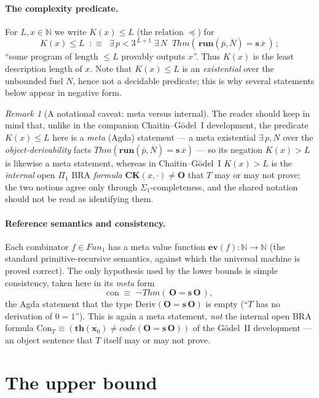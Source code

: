 \documentclass[11pt]{article}
\theoremstyle{plain}
\theoremstyle{definition}
\theoremstyle{remark}
\newtheorem{remark}[theorem]{Remark}
\newcommand{\code}[1]{\mathit{code}(#1)}
\newcommand{\thmT}{\mathbf{th}}
\newcommand{\run}{\mathbf{run}}
\newcommand{\ev}{\mathbf{ev}}
\newcommand{\Fun}{\mathit{Fun}}
\newcommand{\Con}{\mathrm{Con}}
\newcommand{\Thm}[1]{\mathit{Thm}(#1)}
\newcommand{\Kc}{K}
\newcommand{\Kle}{\preccurlyeq}
\begin{document}
\paragraph{The complexity predicate.}
For $L,x\in\mathbb N$ we write $\Kc(x)\le L$ (the relation $\Kle$) for
\[
  \Kc(x)\le L \;\;:\equiv\;\;
  \exists\,p<3^{\,L+1}\;\exists\,N\;\;
  \Thm{\,\run(\overline p,\overline N)=\mathbf{s}\,\overline x\,}\,;
\]
``some program of length $\le L$ provably outputs $x$''. Thus $\Kc(x)$ is
the least description length of $x$. Note that $\Kc(x)\le L$ is an
\emph{existential} over the unbounded fuel $N$, hence not a decidable
predicate; this is why several statements below appear in negative form.

\begin{remark}[A notational caveat: meta versus internal]
The reader should keep in mind that, unlike in the companion
Chaitin--G\"odel~I development, the predicate $\Kc(x)\le L$ here is a
\emph{meta} (Agda) statement --- a meta existential $\exists\,p,N$ over the
\emph{object-derivability} facts $\Thm{\run(\overline p,\overline
N)=\mathbf{s}\,\overline x}$ --- so its negation $\Kc(x)>L$ is likewise a
meta statement, whereas in Chaitin--G\"odel~I $\Kc(x)>L$ is the
\emph{internal} open $\Pi_1$ BRA \emph{formula} $\mathbf{CK}(x,\cdot)\neq
\mathbf{O}$ that $T$ may or may not prove; the two notions agree only
through $\Sigma_1$-completeness, and the shared notation should not be read
as identifying them.
\end{remark}

\paragraph{Reference semantics and consistency.}
Each combinator $f\in\Fun_1$ has a meta value function
$\ev(f):\mathbb N\to\mathbb N$ (the standard primitive-recursive
semantics, against which the universal machine is proved correct). The
only hypothesis used by the lower bounds is simple consistency, taken here
in its \emph{meta} form
\[
  \mathrm{con}\;\equiv\;\neg\,\Thm{\,\mathbf{O}=\mathbf{s}\,\mathbf{O}\,},
\]
the Agda statement that the type
$\mathrm{Deriv}(\mathbf{O}=\mathbf{s}\,\mathbf{O})$ is empty (``$T$ has no
derivation of $0=1$''). This is again a meta statement, \emph{not} the
internal open BRA formula
$\Con_T\equiv(\thmT(\mathbf{x}_0)\neq\code{\mathbf{O}=\mathbf{s}\,\mathbf{O}})$
of the G\"odel~II development --- an object sentence that $T$ itself may or
may not prove.

\section{The upper bound}
\end{document}
